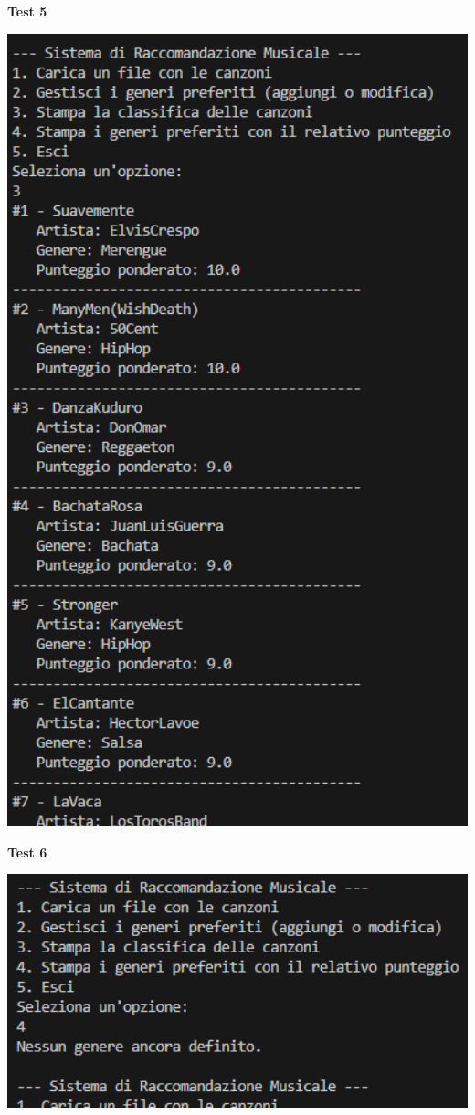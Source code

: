\documentclass[a4paper,11pt]{article}
\begin{document}
\newpage
\begin{center}
    \textbf{Test 5}
    \par
    \vspace{0.5cm}
    \includegraphics[width=1\textwidth]{htest5}
\end{center}
\begin{center}
    \textbf{Test 6}
    \par
    \vspace{0.5cm}
    \includegraphics[width=1\textwidth]{htest6}
\end{center}
\end{document}
